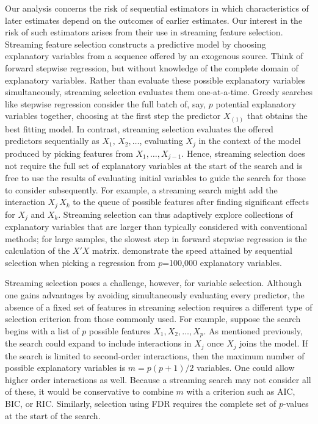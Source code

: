 \documentclass[12pt]{article}
\begin{document}
 Our analysis concerns the risk of sequential estimators in which
 characteristics of later estimates depend on the outcomes of earlier
 estimates.  Our interest in the risk of such estimators arises from their use
 in streaming feature selection.  Streaming feature selection constructs a
 predictive model by choosing explanatory variables from a sequence offered by
 an exogenous source.  Think of forward stepwise regression, but without
 knowledge of the complete domain of explanatory variables.  Rather than evaluate
 these possible explanatory variables simultaneously, streaming selection
 evaluates them one-at-a-time.  Greedy searches like stepwise regression consider
 the full batch of, say, $p$ potential explanatory variables together, choosing
 at the first step the predictor $X_{(1)}$ that obtains the best fitting model.
  In contrast, streaming selection evaluates the offered predictors sequentially
 as $X_1, \, X_2, \ldots$, evaluating $X_j$ in the context of
 the model produced by picking features from $X_1, \ldots, X_{j-1}$.  Hence,
 streaming selection does not require the full set of explanatory variables at
 the start of the search and is free to use the results of evaluating initial
 variables to guide the search for those to consider subsequently.  For example,
 a streaming search might add the interaction $X_j \, X_k$ to the queue of
 possible features after finding significant effects for $X_j$ and $X_k$.
  Streaming selection can thus adaptively explore collections of explanatory
 variables that are larger than typically considered with conventional methods;
 for large samples, the slowest step in forward stepwise regression is the
 calculation of the $X'X$ matrix.  \citet{fosterlin11} demonstrate the speed
 attained by sequential selection when picking a regression from
 $p$=100,000 explanatory variables.


 Streaming selection poses a challenge, however, for variable selection.
  Although one gains advantages by avoiding simultaneously evaluating every
 predictor, the absence of a fixed set of features in streaming selection
 requires a different type of selection criterion from those commonly used.  For
 example, suppose the search begins with a list of $p$ possible features $X_1,
 X_2, \ldots, X_p$.  As mentioned previously, the search could expand to include
 interactions in $X_j$ once $X_j$ joins the model.  If the search is limited to
 second-order interactions,
 then the maximum number of possible explanatory variables is $m = p(p+1)/2$
 variables.  One could allow higher order interactions as well.  Because a streaming search may not consider all of these, it would be conservative to combine $m$ with a criterion such as AIC, BIC, or RIC.
  Similarly, selection using FDR requires the complete set of $p$-values at the
 start of the search.
\end{document}
